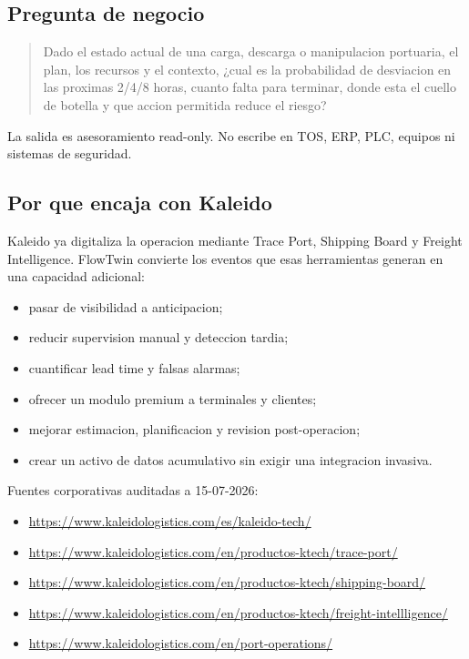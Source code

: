 \documentclass[
  spanish,
  10pt,
  a4paper,
]{article}
\providecommand{\tightlist}{%
  \setlength{\itemsep}{0pt}\setlength{\parskip}{0pt}}
\begin{document}
\subsection{Pregunta de negocio}\label{pregunta-de-negocio}

\begin{quote}
Dado el estado actual de una carga, descarga o manipulacion portuaria,
el plan, los recursos y el contexto, ¿cual es la probabilidad de
desviacion en las proximas 2/4/8 horas, cuanto falta para terminar,
donde esta el cuello de botella y que accion permitida reduce el riesgo?
\end{quote}

La salida es asesoramiento read-only. No escribe en TOS, ERP, PLC,
equipos ni sistemas de seguridad.

\subsection{Por que encaja con
Kaleido}\label{por-que-encaja-con-kaleido}

Kaleido ya digitaliza la operacion mediante Trace Port, Shipping Board y
Freight Intelligence. FlowTwin convierte los eventos que esas
herramientas generan en una capacidad adicional:

\begin{itemize}
\tightlist
\item
  pasar de visibilidad a anticipacion;
\item
  reducir supervision manual y deteccion tardia;
\item
  cuantificar lead time y falsas alarmas;
\item
  ofrecer un modulo premium a terminales y clientes;
\item
  mejorar estimacion, planificacion y revision post-operacion;
\item
  crear un activo de datos acumulativo sin exigir una integracion
  invasiva.
\end{itemize}

Fuentes corporativas auditadas a 15-07-2026:

\begin{itemize}
\tightlist
\item
  \url{https://www.kaleidologistics.com/es/kaleido-tech/}
\item
  \url{https://www.kaleidologistics.com/en/productos-ktech/trace-port/}
\item
  \url{https://www.kaleidologistics.com/en/productos-ktech/shipping-board/}
\item
  \url{https://www.kaleidologistics.com/en/productos-ktech/freight-intellligence/}
\item
  \url{https://www.kaleidologistics.com/en/port-operations/}
\end{itemize}
\end{document}
